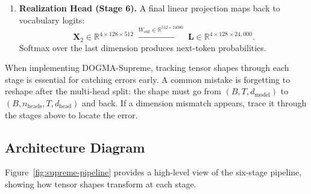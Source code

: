 \begin{enumerate}[leftmargin=1.8em]
  \item \textbf{Realization Head (Stage 6).} A final linear projection maps back to vocabulary logits:
  \begin{equation*}
    \mathbf{X}_2 \in \mathbb{R}^{4 \times 128 \times 512} \;\xrightarrow{W_{\mathrm{out}} \in \mathbb{R}^{512 \times 24000}}\; \mathbf{L} \in \mathbb{R}^{4 \times 128 \times 24{,}000}.
  \end{equation*}
  Softmax over the last dimension produces next-token probabilities.
\end{enumerate}

\begin{keyinsight}
When implementing DOGMA-Supreme, tracking tensor shapes through each stage is essential for catching errors early. A common mistake is forgetting to reshape after the multi-head split: the shape must go from $(B, T, d_{\text{model}})$ to $(B, n_{\text{heads}}, T, d_{\text{head}})$ and back. If a dimension mismatch appears, trace it through the stages above to locate the error.
\end{keyinsight}

\subsection{Architecture Diagram}
\label{sec:architecture-diagram}

Figure~\ref{fig:supreme-pipeline} provides a high-level view of the six-stage pipeline, showing how tensor shapes transform at each stage.

